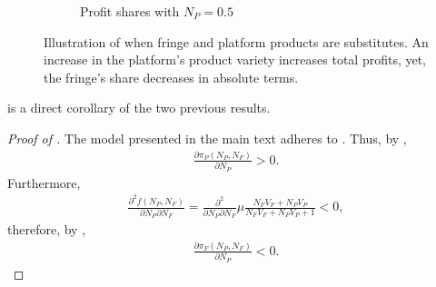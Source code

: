 \documentclass[a4paper]{article}
\begin{document}
\begin{figure}[ht]
\begin{subfigure}[b]{0.45\textwidth}
        \caption{Profit shares with $N_P = 0.5$}
    \end{subfigure}
    \caption{Illustration of  when fringe and platform products are substitutes. An increase in the platform's product variety increases total profits, yet, the fringe's share decreases in absolute terms.}
    \label{fig:increase_N_P_fringe}
\end{figure}

 is a direct corollary of the two previous results.
\begin{proof}[Proof of ]
    The model presented in the main text adheres to . Thus, by ,
    \begin{align*}
        \frac{\partial \pi_P(N_P, N_F)}{\partial N_P} > 0.
    \end{align*}
    Furthermore,
    \begin{align*}
        \frac{\partial^2 f(N_P, N_F)}{\partial N_P \partial N_F} = \frac{\partial^2}{\partial N_P \partial N_F} \mu \frac{N_F V_F + N_P V_P}{N_F V_F + N_P V_P + 1} < 0,
    \end{align*}
    therefore, by ,
    \begin{align*}
        \frac{\partial \pi_F(N_P, N_F)}{\partial N_P} < 0.
    \end{align*}    
\end{proof}
\end{document}
